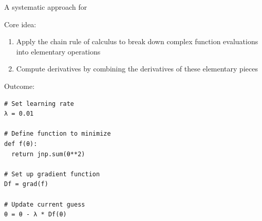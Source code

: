 \begin{frame}

    A systematic approach for 

        \vspace{0.5em}
    Core idea:

        \vspace{0.5em}
    \begin{enumerate}
        \item Apply the chain rule of calculus to break down complex function evaluations into elementary operations
        \vspace{0.5em}
        \item Compute derivatives by combining the derivatives of these elementary pieces
    \end{enumerate}

        \vspace{0.5em}
        \vspace{0.5em}
        \vspace{0.5em}
        Outcome: 

\end{frame}

\begin{frame}[fragile]
    
    
    \begin{verbatim}
# Set learning rate
λ = 0.01

# Define function to minimize
def f(θ):
  return jnp.sum(θ**2)

# Set up gradient function 
Df = grad(f)

# Update current guess
θ = θ - λ * Df(θ)
    \end{verbatim}

\end{frame}

